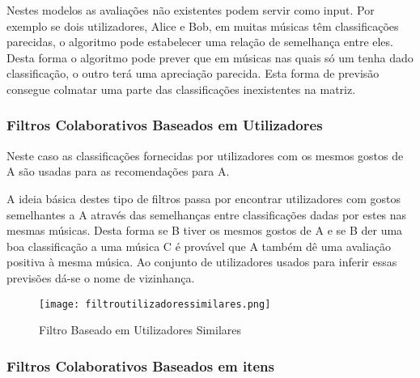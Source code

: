 \par Nestes modelos as avaliações não existentes podem servir como input. Por exemplo se dois utilizadores, Alice e Bob, em muitas músicas têm classificações parecidas, o algoritmo pode estabelecer uma relação de semelhança entre eles. Desta forma o algoritmo pode prever que em músicas nas quais só um tenha dado classificação, o outro terá uma apreciação parecida. Esta forma de previsão consegue colmatar uma parte das classificações inexistentes na matriz.







\hfill

\subsubsection{ Filtros Colaborativos Baseados em Utilizadores}

\hfill

 \par Neste caso as classificações fornecidas por utilizadores com os mesmos gostos de A são usadas para as recomendações para A. 

 \par A ideia básica destes tipo de filtros passa por encontrar utilizadores com gostos semelhantes a A através das semelhanças entre classificações dadas por estes nas mesmas músicas. Desta forma se B tiver os mesmos gostos de A e se B der uma boa classificação a uma música C é provável que A também dê uma avaliação positiva à mesma música. Ao conjunto de utilizadores usados para inferir essas previsões dá-se o nome de vizinhança.

\newline

\hfill

\begin{figure}[H]

  \centering

  \texttt{[image: filtroutilizadoressimilares.png]}

  \caption {Filtro Baseado em Utilizadores Similares}

  \label {fig01}

\end{figure}



\subsubsection{ Filtros Colaborativos Baseados em itens}

